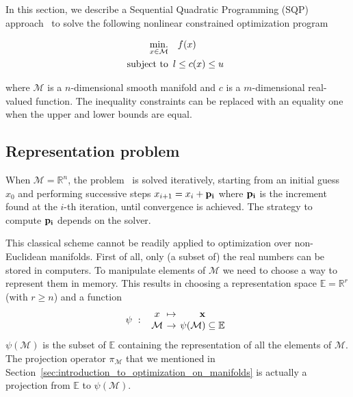 In this section, we describe a Sequential Quadratic Programming (SQP) approach~\cite{nocedal:book:2006} to solve the following nonlinear constrained optimization program

\begin{align}
\label{eq:optim_problem}
  \operatorname*{min.}_{x \in \mathcal{M}} & \quad f(x)\\
  \text{subject to}&
  \begin{array}{lr}
    l \leq c(x) \leq u \nonumber
  \end{array}
\end{align}

where $\mathcal{M}$ is a $n$-dimensional smooth manifold and $c$ is a $m$-dimensional real-valued function.
The inequality constraints can be replaced with an equality one when the upper and lower bounds are equal.

\subsection{Representation problem}
When $\mathcal{M} = \mathbb{R}^n$, the problem~ is solved iteratively, starting from an initial guess $x_0$ and performing successive steps $x_{i+1} = x_i + {\bf p_i}$ where ${\bf p_i}$ is the increment found at the $i$-th iteration, until convergence is achieved.
The strategy to compute ${\bf p_i}$ depends on the solver.

This classical scheme cannot be readily applied to optimization over non-Euclidean manifolds.
First of all, only (a subset of) the real numbers can be stored in computers.
To manipulate elements of $\mathcal{M}$ we need to choose a way to represent them in memory.
This results in choosing a representation space $\mathbb{E} = \mathbb{R}^r$ (with $r \geq n$) and a function
\begin{equation}
  \psi\ :\
  \begin{array}{ccc}
    x & \reduce{\mapsto}{6} & \mathbf{x} \\
    \mathcal{M} & \reduce{\rightarrow}{6} & \psi(\mathcal{M}) \subseteq \mathbb{E}
  \end{array}\nonumber%
\end{equation}
$\psi(\mathcal{M})$ is the subset of $\mathbb{E}$ containing the representation of all the elements of $\mathcal{M}$.
The projection operator $\pi_\mathcal{M}$ that we mentioned in Section~\ref{sec:introduction_to_optimization_on_manifolds} is actually a projection from $\mathbb{E}$ to $\psi(\mathcal{M})$.

